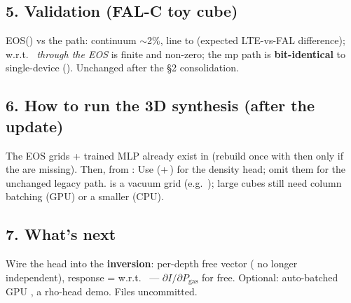 \subsection*{5. Validation (FAL-C toy cube)}
EOS() vs the  path: continuum $\sim$2\%, line  to  (expected
LTE-vs-FAL  difference);  w.r.t.\  \emph{through the EOS} is finite and
non-zero; the mp path is \textbf{bit-identical} to single-device (). Unchanged
after the \S2 consolidation.

\subsection*{6. How to run the 3D synthesis (after the update)}
The EOS grids + trained MLP already exist in  (rebuild once with
 then  only if the
 are missing). Then, from :
\vspace{-3pt}{\footnotesize
\begin{verbatim}
from muram_loader import load_muram_cube        # 1. MURaM snapshot -> cube carrying Pg
cube, dz, meta = load_muram_cube(datapath, iteration, kind="muramsub", eos_input="pg")
from synth3d import synth_cube_map              # 2a. GPU, whole cube in one shot
I = synth_cube_map(waves, dz, cube, mode="pg")          # -> (nx, ny, 4, nwave)
from synth3d_mp import synth_cube_mp            # 2b. CPU pool; call under `__main__`
I = synth_cube_mp(waves, dz, cube, nworkers=64, tile=16, eos_mode="pg")
\end{verbatim}}\vspace{-3pt}
Use  (+\,) for the density head; omit them for the
unchanged legacy  path.  is a vacuum grid (e.g.\ ); large
cubes still need column batching (GPU) or a smaller  (CPU).

\subsection*{7. What's next}
Wire the  head into the \textbf{inversion}: per-depth free vector
 ( no longer independent), response =
 w.r.t.\  --- $\partial I/\partial P_\mathrm{gas}$ for free.
Optional: auto-batched GPU , a rho-head demo. Files uncommitted.


